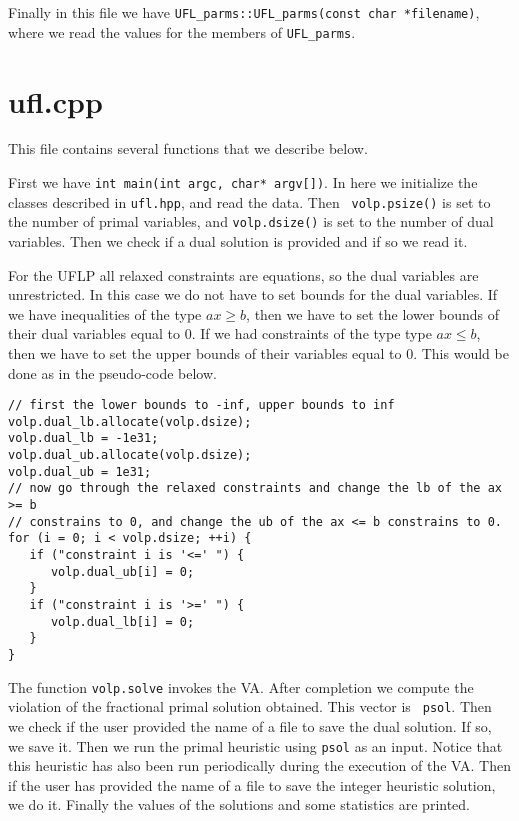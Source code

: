 \documentclass{article}
\begin{document}
Finally in this file we have {\tt UFL\_parms::UFL\_parms(const char
*filename)}, where we read the values for the members of {\tt UFL\_parms}.


\section{ufl.cpp}

This file contains several functions that we describe below.

First we have {\tt int main(int argc, char* argv[])}. In here we initialize
the classes described in {\tt ufl.hpp}, and read the data. Then {\tt
volp.psize()} is set to the number of primal variables, and {\tt volp.dsize()}
is set to the number of dual variables. Then we check if a dual solution is
provided and if so we read it.

For the UFLP all relaxed constraints are equations, so the dual variables are
unrestricted. In this case we do not have to set bounds for the dual
variables. If we have inequalities of the type $ax \ge b$, then we have to set
the lower bounds of their dual variables equal to 0. If we had constraints of
the type type $ax \le b$, then we have to set the upper bounds of their
variables equal to 0. This would be done as in the pseudo-code below.

\begin{verbatim}
// first the lower bounds to -inf, upper bounds to inf 
volp.dual_lb.allocate(volp.dsize);
volp.dual_lb = -1e31;
volp.dual_ub.allocate(volp.dsize);
volp.dual_ub = 1e31;
// now go through the relaxed constraints and change the lb of the ax >= b
// constrains to 0, and change the ub of the ax <= b constrains to 0.
for (i = 0; i < volp.dsize; ++i) {
   if ("constraint i is '<=' ") {
      volp.dual_ub[i] = 0;
   }
   if ("constraint i is '>=' ") {
      volp.dual_lb[i] = 0;
   }
}
\end{verbatim}

The function {\tt volp.solve} invokes the VA. After completion we compute the
violation of the fractional primal solution obtained. This vector is {\tt
psol}. Then we check if the user provided the name of a file to save the dual
solution. If so, we save it. Then we run the primal heuristic using {\tt psol}
as an input. Notice that this heuristic has also been run periodically during
the execution of the VA. Then if the user has provided the name of a file to
save the integer heuristic solution, we do it. Finally the values of the
solutions and some statistics are printed.
\end{document}
